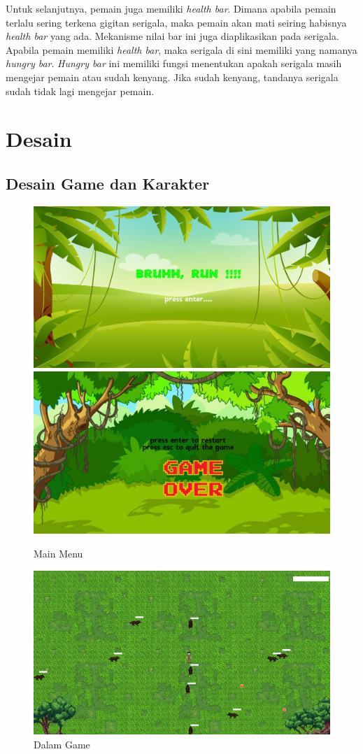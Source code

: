 \documentclass[oneside, a4paper ,12pt]{book}
\begin{document}
	Untuk selanjutnya, pemain juga memiliki \textit{health bar}. Dimana apabila pemain terlalu sering terkena gigitan serigala, maka pemain akan mati seiring habisnya \textit{health bar} yang ada. Mekanisme nilai bar ini juga diaplikasikan pada serigala. Apabila pemain memiliki \textit{health bar}, maka serigala di sini memiliki yang namanya \textit{hungry bar}. \textit{Hungry bar} ini memiliki fungsi menentukan apakah serigala masih mengejar pemain atau sudah kenyang. Jika sudah kenyang, tandanya serigala sudah tidak lagi mengejar pemain.
	
	\chapter{Desain}
	\section{Desain Game dan Karakter}
	\begin{figure} [h]
		\centering
		\includegraphics[width=10 cm]{main_menu.png}
		\includegraphics[width=10 cm]{game_over.png}
		\caption{Main Menu}
	\end{figure}
	\begin{figure} [h]
		\centering
		\includegraphics[width=10 cm]{in_game.png}
		\caption{Dalam Game}
	\end{figure}
\end{document}
